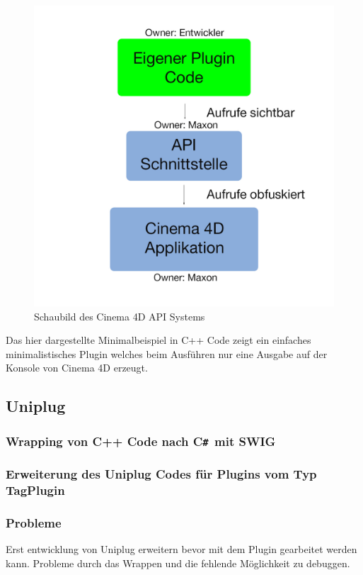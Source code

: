 \documentclass[pagesize, paper=a4, fontsize=12pt,titlepage=true, headings=small, headnosepline, abstractoff, liststotoc, nochapterprefix, plainheadsepline, twoside]{scrreprt}
\newcommand{\CSS}{C\texttt{\# }}
\begin{document}
\begin{figure}[ht]
	\centering
  \includegraphics[width=\linewidth]{Bilder/C4D_Api_Schaubild_v1.jpg}
	\caption{Schaubild des Cinema 4D API Systems}
	\label{C4D API Schaubild}
\end{figure}

Das hier dargestellte Minimalbeispiel in C++ Code zeigt ein einfaches minimalistisches Plugin welches beim Ausführen nur eine Ausgabe auf der Konsole von Cinema 4D erzeugt.


\subsection{Uniplug}
\subsubsection{Wrapping von C++ Code nach \CSS mit SWIG}
\subsubsection{Erweiterung des Uniplug Codes für Plugins vom Typ TagPlugin}
\subsubsection{Probleme}
Erst entwicklung von Uniplug erweitern bevor mit dem Plugin gearbeitet werden kann. Probleme durch das Wrappen und die fehlende Möglichkeit zu debuggen.
\end{document}
